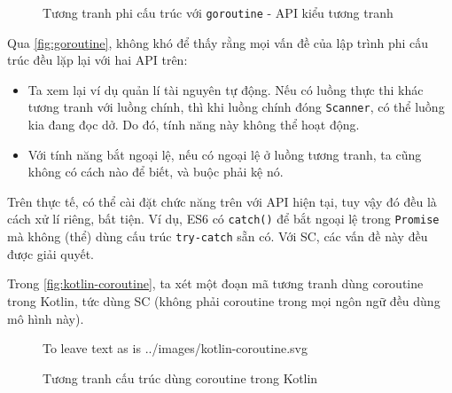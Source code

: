 \documentclass[../../thesis]{subfiles}
\begin{document}
\begin{figure}
    \centering
    
    \vspace*{-10mm}
    \caption{Tương tranh phi cấu trúc với \texttt{goroutine} - API kiểu tương
        tranh \cite{NJS_SC}}
    \label{fig:goroutine}
\end{figure}

Qua \autoref{fig:goroutine}, không khó để thấy rằng mọi vấn đề của lập trình phi
cấu trúc đều lặp lại với hai API trên:

\begin{itemize}
    \item
        Ta xem lại ví dụ quản lí tài nguyên tự động. Nếu có luồng thực thi khác
        tương tranh với luồng chính, thì khi luồng chính đóng \texttt{Scanner},
        có thể luồng kia đang đọc dở. Do đó, tính năng này không thể hoạt động.
\end{itemize}

\begin{itemize}[resume, before = \vspace*{-\dimexpr\topsep+\partopsep\relax}]
    \item
        Với tính năng bắt ngoại lệ, nếu có ngoại lệ ở luồng tương tranh, ta cũng
        không có cách nào để biết, và buộc phải kệ nó.
\end{itemize}

Trên thực tế, có thể cài đặt chức năng trên với API hiện tại, tuy vậy đó đều là
cách xử lí riêng, bất tiện. Ví dụ, ES6 có \texttt{catch()} để bắt ngoại lệ trong
\texttt{Promise} mà không (thể) dùng cấu trúc \texttt{try-catch} sẵn có. Với SC,
các vấn đề này đều được giải quyết.

Trong \autoref{fig:kotlin-coroutine}, ta xét một đoạn mã tương tranh dùng
coroutine trong Kotlin, tức dùng SC (không phải coroutine trong mọi ngôn ngữ đều
dùng mô hình này).

\begin{figure}
    \centering
    \vspace*{-4mm}
     To leave text as is
        {../images/kotlin-coroutine.svg}                 %
    \vspace*{-10mm}
    \caption{Tương tranh cấu trúc dùng coroutine trong Kotlin \cite{NJS_SC}}
    \label{fig:kotlin-coroutine}
\end{figure}
\end{document}
